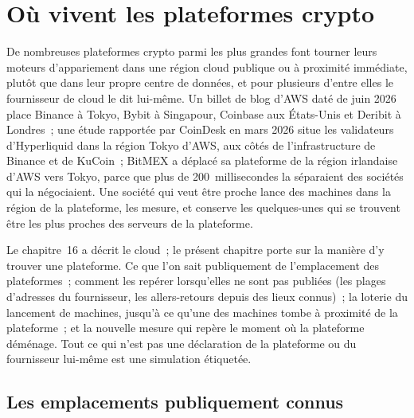 \chapter{Où vivent les plateformes crypto}\label{ch:nw:where-the-crypto-venues-live}

De nombreuses plateformes crypto parmi les plus grandes font tourner leurs moteurs d'appariement dans une région cloud publique ou à proximité immédiate, plutôt que dans leur propre
centre de données, et pour plusieurs d'entre elles le fournisseur de cloud le dit lui-même. Un billet de blog d'AWS daté de juin 2026 place Binance à Tokyo, Bybit à Singapour, Coinbase aux États-Unis et Deribit à Londres~;
une étude rapportée par CoinDesk en mars 2026 situe les validateurs d'Hyperliquid dans la région Tokyo d'AWS, aux côtés de l'infrastructure de Binance et de KuCoin~;
BitMEX a déplacé sa plateforme de la région irlandaise d'AWS vers Tokyo, parce que plus de 200~millisecondes la séparaient des sociétés qui la négociaient. Une
société qui veut être proche lance des machines dans la région de la plateforme, les mesure, et conserve les quelques-unes qui se trouvent être les plus proches
des serveurs de la plateforme.

Le chapitre~16 a décrit le cloud~; le présent chapitre porte sur la manière d'y trouver une plateforme. Ce que l'on sait publiquement de l'emplacement des plateformes~; comment les repérer
lorsqu'elles ne sont pas publiées (les plages d'adresses du fournisseur, les allers-retours depuis des lieux connus)~; la loterie du lancement de machines, jusqu'à
ce qu'une des machines tombe à proximité de la plateforme~; et la nouvelle mesure qui repère le moment où la plateforme déménage. Tout ce qui n'est pas une déclaration de la plateforme ou du fournisseur lui-même est une
simulation étiquetée.

\section{Les emplacements publiquement connus}

